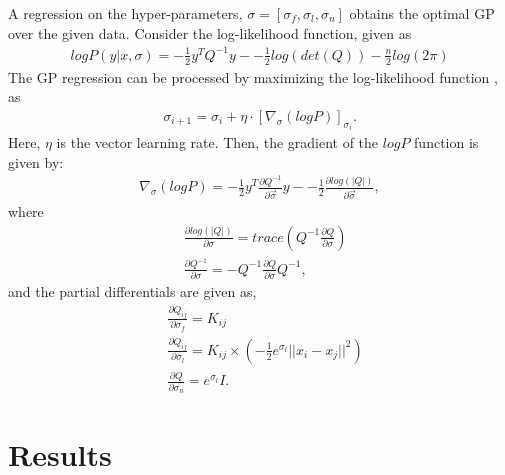 \documentclass[conference]{IEEEtran}
\begin{document}
A regression on the hyper-parameters, $\sigma = [\sigma_f,\sigma_l,\sigma_n]$ obtains the optimal GP over the given data. 
Consider the log-likelihood function, given as 
\begin{equation}
\begin{aligned}
    log P(y|x,\sigma) = -\frac{1}{2}y^TQ^{-1}y - -\frac{1}{2}log(det(Q)) - \frac{n}{2}log(2\pi)
     \label{eq:logP}
\end{aligned}
\end{equation}
The GP regression can be processed by maximizing the log-likelihood function \cite{bishop}, as 
\begin{equation}
\begin{aligned}
	\sigma_{i+1} = \sigma_{i} + \eta\cdot
	\left[ {\nabla}_\sigma (log P) \right]_{\sigma_i}.
	\label{eq:gradient ascent}
\end{aligned}
\end{equation}
Here, $\eta$ is the vector learning rate.
Then, the gradient of the $logP$ function is given by:
\begin{equation}
\begin{aligned}
    {\nabla}_\sigma(log P) = -\frac{1}{2}y^T\frac{\partial Q^{-1}}{\partial \Vec{\sigma}}y - -\frac{1}{2}\frac{\partial log(|Q|)}{\partial \Vec{\sigma}},
\end{aligned}
\end{equation}
where
\begin{equation}
\begin{aligned}
    &\frac{\partial log(|Q|)}{\partial {\sigma}} = trace\left( Q^{-1}\frac{\partial Q}{\partial {\sigma}}\right)\\
    &\frac{\partial Q^{-1}}{\partial {\sigma}} = -Q^{-1} \frac{\partial Q}{\partial {\sigma}} Q^{-1},
\end{aligned}
\end{equation}    
and the partial differentials are given as,
\begin{equation}
\begin{aligned}
    &\frac{\partial Q_{ij}}{\partial \sigma_f} = K_{ij}\\
    &\frac{\partial Q_{ij}}{\partial \sigma_l} = K_{ij}\times \left(-\frac{1}{2}e^{\sigma_l}||x_i-x_j||^2 \right)\\
    &\frac{\partial Q}{\partial \sigma_n} = e^{\sigma_l}I.
\end{aligned}
\end{equation}

\section{Results} %
\end{document}
